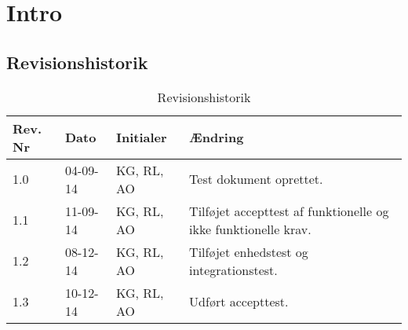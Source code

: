 \chapter{Intro}

\section{Revisionshistorik}

\begin{table}[H]
	\centering
		\begin{tabular}{|p{2 cm}|p{2 cm}|p{3 cm}|p{6 cm}|} 
		\hline
			\textbf{Rev. Nr} & \textbf{Dato}		& \textbf{Initialer} 	& \textbf{Ændring} \\ \hline
			1.0 	& 04-09-14	& KG, RL, AO		& Test dokument oprettet.	\\ \hline
			1.1 	& 11-09-14	& KG, RL, AO		& Tilføjet accepttest af funktionelle \newline og ikke funktionelle krav.\\ \hline
			1.2 	& 08-12-14	& KG, RL, AO		& Tilføjet enhedstest og \newline integrationstest.	\\ \hline
			1.3 	& 10-12-14	& KG, RL, AO		& Udført accepttest.	\\ \hline
		\end{tabular}
	\caption{Revisionshistorik}
\end{table}

